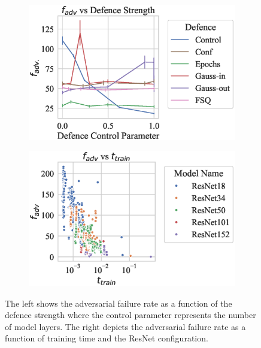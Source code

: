 \begin{figure}[!h]
    \centering
    \begin{subfigure}
        \centering
        \includegraphics[width=.4\textwidth]{mnist/def_param_vs_adv_failure_rate.eps}
    \end{subfigure}
    \begin{subfigure}
        \centering
        \includegraphics[width=.4\textwidth]{mnist/adv_failure_rate_vs_train_time.eps}
    \end{subfigure}
    \caption{The left shows the adversarial failure rate as a function of the defence strength where the control parameter represents the number of model layers. The right depicts the adversarial failure rate as a function of training time and the ResNet configuration.}
    \label{fig:mnist_failure_rate}
\end{figure}

